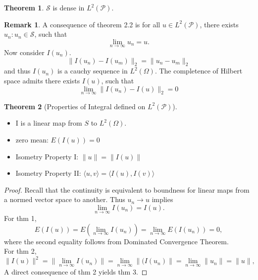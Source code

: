 \documentclass[12pt]{book}
\theoremstyle{definition}
\newtheorem{theorem}{Theorem}[chapter]
\newtheorem{remark}{Remark}
\newcommand{\inner}[2]{{\langle #1,#2\rangle}}
\begin{document}
\begin{theorem}
$\mathcal S$ is dense in $L^2(\mathcal P)$.
\end{theorem}
\begin{remark}
A consequence of theorem 2.2 is for all $u \in L^2(\mathcal P)$, there exists ${u_n:u_n \in \mathcal S}$, such that 
$$
\lim_{n \to \infty} u_n = u.
$$
Now consider ${I(u_n)}$.
$$
\| I(u_n)-I(u_m)\|_2 = \| u_n - u_m\|_2
$$
and thus $I(u_n)$ is a cauchy sequence in $L^2(\Omega)$. The completence of Hilbert space admits there exists $I(u)$, such that 
$$
\lim_{n \to \infty} \| I(u_n) - I(u) \|_2 = 0
$$
\end{remark}


\begin{theorem}[Properties of Integral defined on $L^2(\mathcal P)$] \ \\
\begin{itemize}
	\item I is a linear map from $S$ to $L^2(\Omega)$.
	\item zero mean: $E(I(u))=0$
	\item Isometry Property I: $\| u\| = \| I(u)\|$
	\item Isometry Property II: $\inner{u}{v}=\inner{I(u)}{I(v)}$
\end{itemize}
\end{theorem}
\begin{proof}
Recall that the continuity is equivalent to boundness for linear maps from a normed vector space to another. Thus $u_n \to u$ implies
$$
\lim_{n\to \infty} I(u_n) = I(u).
$$
For thm 1,
$$
E(I(u)) = E(\lim_{n\to \infty} I(u_n)) = \lim_{n \to \infty}E(I(u_n))=0,
$$	
where the second equality follows from Dominated Convergence Theorem. \\
For thm 2,
$$
\| I(u) \|^2 =  \|\lim_{n\to \infty} I(u_n) \| = \lim_{n \to \infty}\|(I(u_n)\|=\lim_{n \to \infty}\| u_n\|=\| u\|,
$$
A direct consequence of thm 2 yields thm 3. 
\end{proof}
\end{document}
